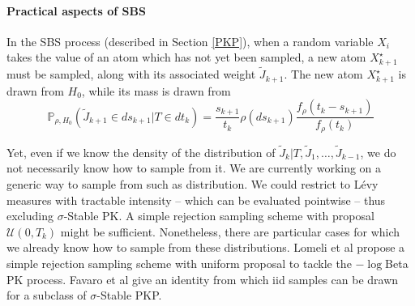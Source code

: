 
\paragraph{Practical aspects of \gls{SBS}}
In the \acrlong{SBS} process (described in Section \ref{PKP}), when a random variable $X_i$ takes the value of an atom which has not yet been sampled, a new atom $X^\star_{k+1}$ must be sampled, along with its associated weight $\tilde{J}_{k+1}$. The new atom $X_{k+1}^\star$ is drawn from $H_0$, while its mass is drawn from
\begin{equation} \label{eq:SBS3}
\mathbb{P}_{\rho,H_0}(\tilde{J}_{k+1} \in ds_{k+1} | T \in dt_k) = \frac{s_{k+1}}{t_k}\rho(ds_{k+1})\frac{f_\rho(t_k - s_{k+1})}{f_\rho(t_k)}
\end{equation}

Yet, even if we know the density of the distribution of $\tilde{J}_{k}|T,\tilde{J}_1,\dots,\tilde{J}_{k-1}$, we do not necessarily know how to sample from it.
We are currently working on a generic way to sample from such as distribution. We could restrict to Lévy measures with tractable intensity -- which can be evaluated pointwise -- thus excluding $\sigma$-Stable \gls{PK}. A simple rejection sampling scheme with proposal $\mathcal{U}(0, T_k)$ might be sufficient.
Nonetheless, there are particular cases for which we already know how to sample from these distributions. Lomeli et al \cite{Lomeli:2015vd} propose a simple rejection sampling scheme with uniform proposal to tackle the $-\log$Beta \gls{PK} process. Favaro et al \cite{Favaro:2014bo} give an identity from which iid samples can be drawn for a subclass of $\sigma$-Stable \gls{PKP}.


